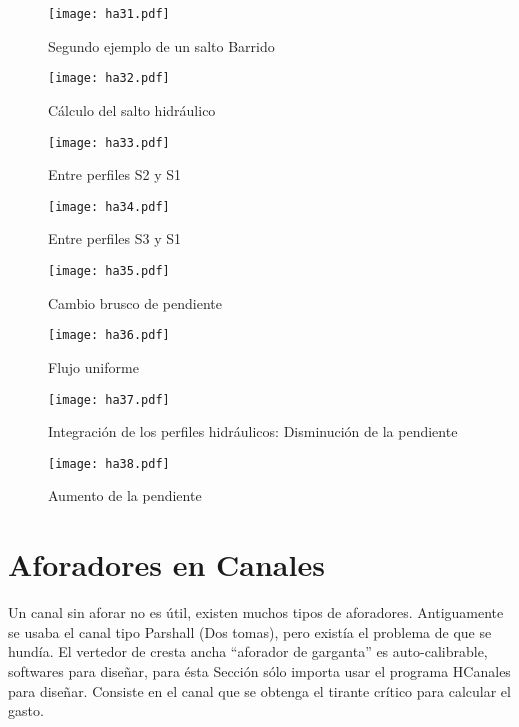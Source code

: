 \begin{figure}[h!]
\centering
  \texttt{[image: ha31.pdf]}
  \caption{Segundo ejemplo de un salto Barrido}
  \label{ha31}
\end{figure}

\begin{figure}[h!]
\centering
  \texttt{[image: ha32.pdf]}
  \caption{Cálculo del salto hidráulico}
  \label{ha32}
\end{figure}

\begin{figure}[h!]
\centering
  \texttt{[image: ha33.pdf]}
  \caption{Entre perfiles S2 y S1}
  \label{ha33}
\end{figure}

\begin{figure}[h!]
\centering
  \texttt{[image: ha34.pdf]}
  \caption{Entre perfiles S3 y S1}
  \label{ha34}
\end{figure}


\begin{figure}[h!]
\centering
  \texttt{[image: ha35.pdf]}
  \caption{Cambio brusco de pendiente}
  \label{ha35}
\end{figure}

\begin{figure}[h!]
\centering
  \texttt{[image: ha36.pdf]}
  \caption{Flujo uniforme}
  \label{ha36}
\end{figure}

\begin{figure}[h!]
\centering
  \texttt{[image: ha37.pdf]}
  \caption{Integración de los perfiles hidráulicos: Disminución de la pendiente}
  \label{ha37}
\end{figure}

\begin{figure}[h!]
\centering
  \texttt{[image: ha38.pdf]}
  \caption{Aumento de la pendiente}
  \label{ha38}
\end{figure}
\section{Aforadores en Canales}
Un canal sin aforar no es útil, existen muchos tipos de aforadores. Antiguamente se usaba el canal tipo Parshall (Dos tomas),
pero existía el problema de que se hundía. El vertedor de cresta ancha ``aforador de garganta'' es auto-calibrable, softwares para diseñar, para ésta Sección
sólo importa usar el programa HCanales para diseñar. Consiste en el canal que se obtenga el tirante crítico para calcular el gasto.

